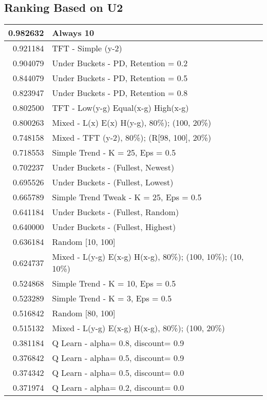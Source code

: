 \begin{table}[!hbtp]
\subsection{Ranking Based on U2}
\begin{footnotesize}
\begin{tabular}{|r|l|}\hline  \label{U3results}
0.982632 & Always 10\\ \hline
0.921184 & TFT - Simple (y-2)\\ \hline
0.904079 & Under Buckets - PD, Retention = 0.2\\ \hline
0.844079 & Under Buckets - PD, Retention = 0.5\\ \hline
0.823947 & Under Buckets - PD, Retention = 0.8\\ \hline
0.802500 & TFT - Low(y-g) Equal(x-g) High(x-g)\\ \hline
0.800263 & Mixed - {L(x) E(x) H(y-g), 80\%); (100, 20\%)}\\ \hline
0.748158 & Mixed - {TFT (y-2), 80\%); (R[98, 100], 20\%)}\\ \hline
0.718553 & Simple Trend - K = 25, Eps = 0.5\\ \hline
0.702237 & Under Buckets - (Fullest, Newest)\\ \hline
0.695526 & Under Buckets - (Fullest, Lowest)\\ \hline
0.665789 & Simple Trend Tweak - K = 25, Eps = 0.5\\ \hline
0.641184 & Under Buckets - (Fullest, Random)\\ \hline
0.640000 & Under Buckets - (Fullest, Highest)\\ \hline
0.636184 & Random [10, 100]\\ \hline
0.624737 & Mixed - {L(y-g) E(x-g) H(x-g), 80\%); (100, 10\%); (10, 10\%)}\\ \hline
0.524868 & Simple Trend - K = 10, Eps = 0.5\\ \hline
0.523289 & Simple Trend - K = 3, Eps = 0.5\\ \hline
0.516842 & Random [80, 100]\\ \hline
0.515132 & Mixed - {L(y-g) E(x-g) H(x-g), 80\%); (100, 20\%)}\\ \hline
0.381184 & Q Learn - alpha= 0.8, discount= 0.9\\ \hline
0.376842 & Q Learn - alpha= 0.5, discount= 0.9\\ \hline
0.374342 & Q Learn - alpha= 0.5, discount= 0.0\\ \hline
0.371974 & Q Learn - alpha= 0.2, discount= 0.0\\ \hline

\end{tabular}
\end{footnotesize}
\end{table}
